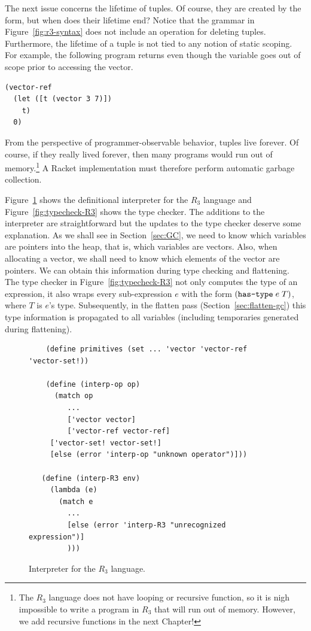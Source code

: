\documentclass[11pt]{book}
\begin{document}
The next issue concerns the lifetime of tuples. Of course, they are
created by the  form, but when does their lifetime end?
Notice that the grammar in Figure~\ref{fig:r3-syntax} does not include
an operation for deleting tuples. Furthermore, the lifetime of a tuple
is not tied to any notion of static scoping. For example, the
following program returns  even though the variable 
goes out of scope prior to accessing the vector.
\begin{lstlisting}
(vector-ref
  (let ([t (vector 3 7)])
    t)
  0)
\end{lstlisting}
From the perspective of programmer-observable behavior, tuples live
forever. Of course, if they really lived forever, then many programs
would run out of memory.\footnote{The $R_3$ language does not have
  looping or recursive function, so it is nigh impossible to write a
  program in $R_3$ that will run out of memory. However, we add
  recursive functions in the next Chapter!} A Racket implementation
must therefore perform automatic garbage collection.

Figure~\ref{fig:interp-R3} shows the definitional interpreter for the
$R_3$ language and Figure~\ref{fig:typecheck-R3} shows the type
checker. The additions to the interpreter are straightforward but the
updates to the type checker deserve some explanation.  As we shall see
in Section~\ref{sec:GC}, we need to know which variables are pointers
into the heap, that is, which variables are vectors. Also, when
allocating a vector, we shall need to know which elements of the
vector are pointers. We can obtain this information during type
checking and flattening. The type checker in
Figure~\ref{fig:typecheck-R3} not only computes the type of an
expression, it also wraps every sub-expression $e$ with the form
$(\texttt{has-type}\; e\; T)$, where $T$ is $e$'s type. Subsequently, in
the flatten pass (Section~\ref{sec:flatten-gc}) this type information is
propagated to all variables (including temporaries generated during
flattening).

\begin{figure}[tbp]
\begin{lstlisting}
    (define primitives (set ... 'vector 'vector-ref 'vector-set!))

    (define (interp-op op)
      (match op
         ...
         ['vector vector]
         ['vector-ref vector-ref]
	 ['vector-set! vector-set!]
	 [else (error 'interp-op "unknown operator")]))

   (define (interp-R3 env)
     (lambda (e)
       (match e
         ...
         [else (error 'interp-R3 "unrecognized expression")]
         )))
\end{lstlisting}
\caption{Interpreter for the $R_3$ language.}
\label{fig:interp-R3}
\end{figure}
\end{document}
